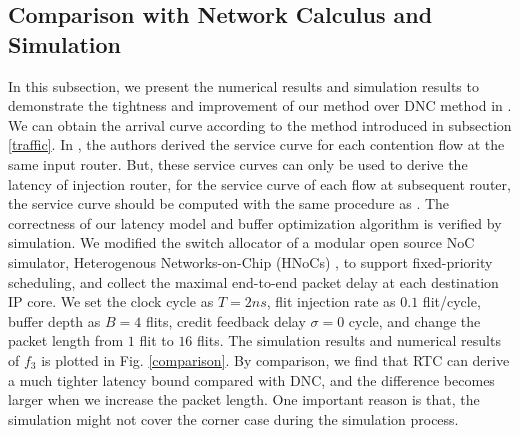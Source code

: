 \documentclass[10pt,journal]{IEEEtran}
\begin{document}
\subsection{Comparison with Network Calculus and Simulation}\label{dnccmp}
In this subsection, we present the numerical results and simulation results to demonstrate the tightness and improvement of our method over DNC method in \cite{Qian489900}. We can obtain the arrival curve according to the method introduced in subsection \ref{traffic}. In \cite{Qian489900}, the authors derived the service curve for each contention flow at the same input router. But, these service curves can only be used to derive the latency of injection router, for the service curve of each flow at subsequent router, the service curve should be computed with the same procedure as \cite{qian2009analysis}. The correctness of our latency model and buffer optimization algorithm is verified by simulation. We modified the switch allocator of a modular open source NoC simulator, Heterogenous Networks-on-Chip (HNoCs) \cite{6404157}, to support fixed-priority scheduling, and collect the maximal end-to-end packet delay at each destination IP core. We set the clock cycle as $T=2ns$, flit injection rate as $0.1$ flit/cycle, buffer depth as $B=4$ flits, credit feedback delay $\sigma=0$ cycle, and change the packet length from $1$ flit to $16$ flits. The simulation results and numerical results of $f_3$ is plotted in Fig. \ref{comparison}. By comparison, we find that RTC can derive a much tighter latency bound compared with DNC, and the difference becomes larger when we increase the packet length. One important reason is that, the simulation might not cover the corner case during the simulation process.
\end{document}
